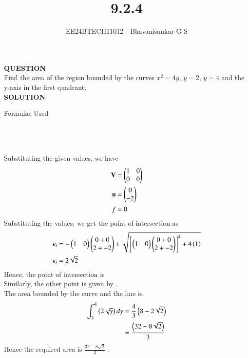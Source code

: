 \documentclass[journal]{IEEEtran}
\begin{document}

\vspace{3cm}

\title{9.2.4}
\author{EE24BTECH11012 - Bhavanisankar G S}
{\let\newpage\relax\maketitle}

\renewcommand{\thefigure}{\theenumi}
\renewcommand{\thetable}{\theenumi}
\setlength{\intextsep}{10pt} %


\renewcommand{\thetable}{\theenumi}

\textbf{QUESTION} \\
Find the area of the region bounded by the curves $ x^2 = 4y $, $ y=2$, $y=4$ and the y-axis in the first quadrant. \\
\textbf{SOLUTION} \\

\begin{table}[h!]
	\centering
        
	\caption{Formulae Used}
	\label{tab9.2.4}
\end{table} \\ \\ \\
Substituting the given values, we have \\
\begin{align}
	\mathbf{V} &= \begin{pmatrix} 1 & 0 \\ 0 & 0 \end{pmatrix} \\
	\mathbf{u} &= \begin{pmatrix} 0 \\ -2 \end{pmatrix} \\
	f &= 0 \\
\end{align}
Substituting the values, we get the point of intersection as \\
\begin{align}
	\kappa_i &= -\begin{pmatrix}1&0\end{pmatrix}\begin{pmatrix}0 + 0 \\ 2 + -2\end{pmatrix} \pm \sqrt{{}\left[\begin{pmatrix}1&0\end{pmatrix}\begin{pmatrix}0+0\\ 2+-2\end{pmatrix} \right]^2 + 4\left(1\right)} \\
	\kappa_i &= 2\sqrt{2} \\
\end{align}
Hence, the point of intersection is  \\
Similarly, the other point is given by  .\\
The area bounded by the curve and the line is \\
\begin{align}
	\int_{2}^{4} \left(2\sqrt{y}\right) dy &= \frac{4}{3}\left(8-2\sqrt{2}\right) \\
	&= \frac{\left(32 - 8\sqrt{2}\right)}{3} \\
\end{align}
Hence the required area is $\frac{32-8\sqrt{2}}{3}$ .
	
\end{document}
